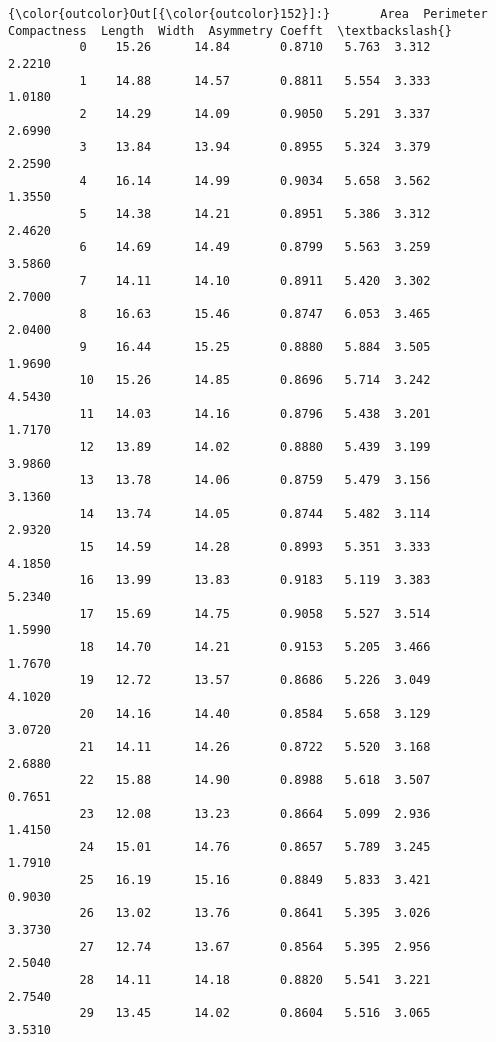 \documentclass[11pt]{article}
\begin{document}
\begin{Verbatim}[commandchars=\\\{\}]
{\color{outcolor}Out[{\color{outcolor}152}]:}       Area  Perimeter  Compactness  Length  Width  Asymmetry Coefft  \textbackslash{}
          0    15.26      14.84       0.8710   5.763  3.312            2.2210   
          1    14.88      14.57       0.8811   5.554  3.333            1.0180   
          2    14.29      14.09       0.9050   5.291  3.337            2.6990   
          3    13.84      13.94       0.8955   5.324  3.379            2.2590   
          4    16.14      14.99       0.9034   5.658  3.562            1.3550   
          5    14.38      14.21       0.8951   5.386  3.312            2.4620   
          6    14.69      14.49       0.8799   5.563  3.259            3.5860   
          7    14.11      14.10       0.8911   5.420  3.302            2.7000   
          8    16.63      15.46       0.8747   6.053  3.465            2.0400   
          9    16.44      15.25       0.8880   5.884  3.505            1.9690   
          10   15.26      14.85       0.8696   5.714  3.242            4.5430   
          11   14.03      14.16       0.8796   5.438  3.201            1.7170   
          12   13.89      14.02       0.8880   5.439  3.199            3.9860   
          13   13.78      14.06       0.8759   5.479  3.156            3.1360   
          14   13.74      14.05       0.8744   5.482  3.114            2.9320   
          15   14.59      14.28       0.8993   5.351  3.333            4.1850   
          16   13.99      13.83       0.9183   5.119  3.383            5.2340   
          17   15.69      14.75       0.9058   5.527  3.514            1.5990   
          18   14.70      14.21       0.9153   5.205  3.466            1.7670   
          19   12.72      13.57       0.8686   5.226  3.049            4.1020   
          20   14.16      14.40       0.8584   5.658  3.129            3.0720   
          21   14.11      14.26       0.8722   5.520  3.168            2.6880   
          22   15.88      14.90       0.8988   5.618  3.507            0.7651   
          23   12.08      13.23       0.8664   5.099  2.936            1.4150   
          24   15.01      14.76       0.8657   5.789  3.245            1.7910   
          25   16.19      15.16       0.8849   5.833  3.421            0.9030   
          26   13.02      13.76       0.8641   5.395  3.026            3.3730   
          27   12.74      13.67       0.8564   5.395  2.956            2.5040   
          28   14.11      14.18       0.8820   5.541  3.221            2.7540   
          29   13.45      14.02       0.8604   5.516  3.065            3.5310   

\end{Verbatim}
\end{document}
